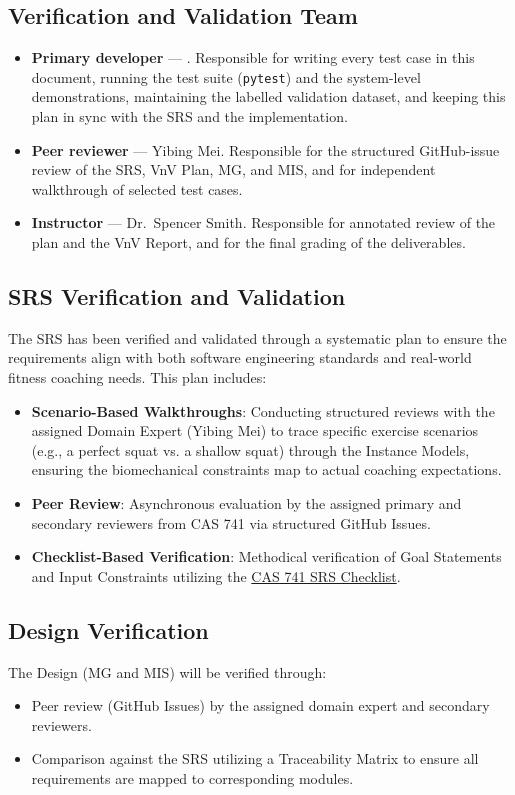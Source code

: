 \documentclass[12pt, titlepage]{article}
\begin{document}
\subsection{Verification and Validation Team}
\begin{itemize}
  \item \textbf{Primary developer} --- \authname{}. Responsible for
    writing every test case in this document, running the test suite
    (\texttt{pytest}) and the system-level demonstrations, maintaining
    the labelled validation dataset, and keeping this plan in sync with
    the SRS and the implementation.
  \item \textbf{Peer reviewer} --- Yibing Mei. Responsible for the
    structured GitHub-issue review of the SRS, VnV Plan, MG, and MIS,
    and for independent walkthrough of selected test cases.
  \item \textbf{Instructor} --- Dr.\ Spencer Smith. Responsible for
    annotated review of the plan and the VnV Report, and for the final
    grading of the deliverables.
\end{itemize}

\subsection{SRS Verification and Validation}
The SRS has been verified and validated through a systematic plan to ensure the requirements align with both software engineering standards and real-world fitness coaching needs. This plan includes:
\begin{itemize}
    \item \textbf{Scenario-Based Walkthroughs}: Conducting structured reviews with the assigned Domain Expert (Yibing Mei) to trace specific exercise scenarios (e.g., a perfect squat vs. a shallow squat) through the Instance Models, ensuring the biomechanical constraints map to actual coaching expectations.
    \item \textbf{Peer Review}: Asynchronous evaluation by the assigned primary and secondary reviewers from CAS 741 via structured GitHub Issues.
    \item \textbf{Checklist-Based Verification}: Methodical verification of Goal Statements and Input Constraints utilizing the \href{https://github.com/smiths/capTemplate/blob/main/docs/Checklists/SRS-Checklist.pdf}{CAS 741 SRS Checklist}.
\end{itemize}

\subsection{Design Verification}
The Design (MG and MIS) will be verified through:
\begin{itemize}
    \item Peer review (GitHub Issues) by the assigned domain expert and secondary reviewers.
    \item Comparison against the SRS utilizing a Traceability Matrix to ensure all requirements are mapped to corresponding modules.
\end{itemize}
\end{document}
